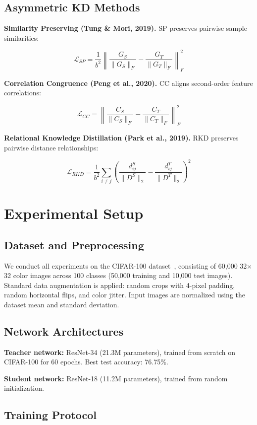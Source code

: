 \documentclass[symmetry,article,submit,pdftex,moreauthors]{Definitions/mdpi}
\begin{document}
\subsection{Asymmetric KD Methods}

\textbf{Similarity Preserving (Tung \& Mori, 2019).} SP preserves pairwise sample similarities:

$$\mathcal{L}_{SP} = \frac{1}{b^2} \left\| \frac{G_S}{\|G_S\|_F} - \frac{G_T}{\|G_T\|_F} \right\|_F^2$$

\textbf{Correlation Congruence (Peng et al., 2020).} CC aligns second-order feature correlations:

$$\mathcal{L}_{CC} = \left\| \frac{C_S}{\|C_S\|_F} - \frac{C_T}{\|C_T\|_F} \right\|_F^2$$

\textbf{Relational Knowledge Distillation (Park et al., 2019).} RKD preserves pairwise distance relationships:

$$\mathcal{L}_{RKD} = \frac{1}{b^2} \sum_{i \neq j} \left( \frac{d_{ij}^S}{\|D^S\|_2} - \frac{d_{ij}^T}{\|D^T\|_2} \right)^2$$

\section{Experimental Setup}

\subsection{Dataset and Preprocessing}

We conduct all experiments on the CIFAR-100 dataset~\cite{ref19}, consisting of 60,000 32$\times$32 color images across 100 classes (50,000 training and 10,000 test images). Standard data augmentation is applied: random crops with 4-pixel padding, random horizontal flips, and color jitter. Input images are normalized using the dataset mean and standard deviation.

\subsection{Network Architectures}

\textbf{Teacher network:} ResNet-34 (21.3M parameters), trained from scratch on CIFAR-100 for 60 epochs. Best test accuracy: 76.75\%.

\textbf{Student network:} ResNet-18 (11.2M parameters), trained from random initialization.

\subsection{Training Protocol}
\end{document}
